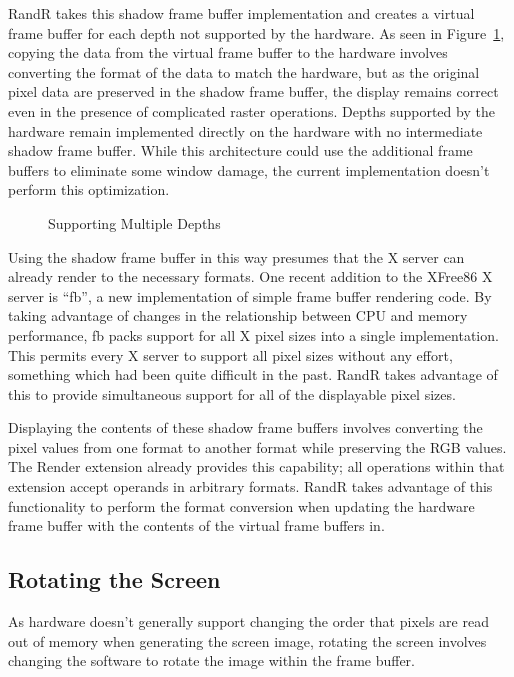\documentclass[twocolumn]{article}
\begin{document}
RandR takes this shadow frame buffer implementation and creates a
virtual frame buffer for each depth not supported by the hardware.  As
seen in Figure~\ref{multi.figure}, copying the data from the virtual
frame buffer to the hardware involves converting the format of the
data to match the hardware, but as the original pixel data are
preserved in the shadow frame buffer, the display remains correct even
in the presence of complicated raster operations.  Depths supported by
the hardware remain implemented directly on the hardware with no
intermediate shadow frame buffer.  While this architecture could use
the additional frame buffers to eliminate some window damage, the
current implementation doesn't perform this optimization.
\begin{figure}
\begin{center}
\caption{Supporting Multiple Depths}
\label{multi.figure}
\end{center}
\end{figure}

Using the shadow frame buffer in this way presumes that the X server can
already render to the necessary formats.  One recent addition to the XFree86
X server is ``fb'', a new implementation of simple frame buffer rendering
code.  By taking advantage of changes in the relationship between CPU and
memory performance, fb packs support for all X pixel sizes into a single
implementation.  This permits every X server to support all pixel sizes
without any effort, something which had been quite difficult in the past.
RandR takes advantage of this to provide simultaneous support for all of the
displayable pixel sizes.

Displaying the contents of these shadow frame buffers involves
converting the pixel values from one format to another format while
preserving the RGB values.  The Render extension already provides this
capability; all operations within that extension accept operands in arbitrary
formats.  RandR takes advantage of this functionality to perform the format
conversion when updating the hardware frame buffer with the contents of the
virtual frame buffers in.

\subsection{Rotating the Screen}

As hardware doesn't generally support changing the order that pixels are
read out of memory when generating the screen image, rotating the screen
involves changing the software to rotate the image within the frame buffer.
\end{document}
